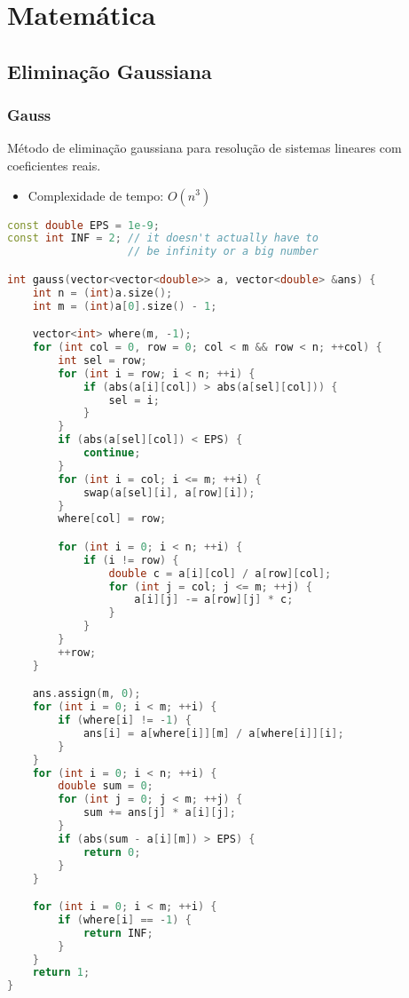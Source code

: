 \documentclass[11pt, a4paper, oneside]{book}
\begin{document}
\hfill

\newpage

%
%
%
%

\chapter{Matemática}

\section{Eliminação Gaussiana}
\subsection{Gauss}


Método de eliminação gaussiana para resolução de sistemas lineares com coeficientes reais.



\begin{itemize}
\item Complexidade de tempo: $O(n^3)$
\end{itemize}

\hfill

\begin{multicols}{2}
\begin{lstlisting}[language=C++]
const double EPS = 1e-9;
const int INF = 2; // it doesn't actually have to
                   // be infinity or a big number

int gauss(vector<vector<double>> a, vector<double> &ans) {
    int n = (int)a.size();
    int m = (int)a[0].size() - 1;

    vector<int> where(m, -1);
    for (int col = 0, row = 0; col < m && row < n; ++col) {
        int sel = row;
        for (int i = row; i < n; ++i) {
            if (abs(a[i][col]) > abs(a[sel][col])) {
                sel = i;
            }
        }
        if (abs(a[sel][col]) < EPS) {
            continue;
        }
        for (int i = col; i <= m; ++i) {
            swap(a[sel][i], a[row][i]);
        }
        where[col] = row;

        for (int i = 0; i < n; ++i) {
            if (i != row) {
                double c = a[i][col] / a[row][col];
                for (int j = col; j <= m; ++j) {
                    a[i][j] -= a[row][j] * c;
                }
            }
        }
        ++row;
    }

    ans.assign(m, 0);
    for (int i = 0; i < m; ++i) {
        if (where[i] != -1) {
            ans[i] = a[where[i]][m] / a[where[i]][i];
        }
    }
    for (int i = 0; i < n; ++i) {
        double sum = 0;
        for (int j = 0; j < m; ++j) {
            sum += ans[j] * a[i][j];
        }
        if (abs(sum - a[i][m]) > EPS) {
            return 0;
        }
    }

    for (int i = 0; i < m; ++i) {
        if (where[i] == -1) {
            return INF;
        }
    }
    return 1;
}
\end{lstlisting}
\end{multicols}
\end{document}
